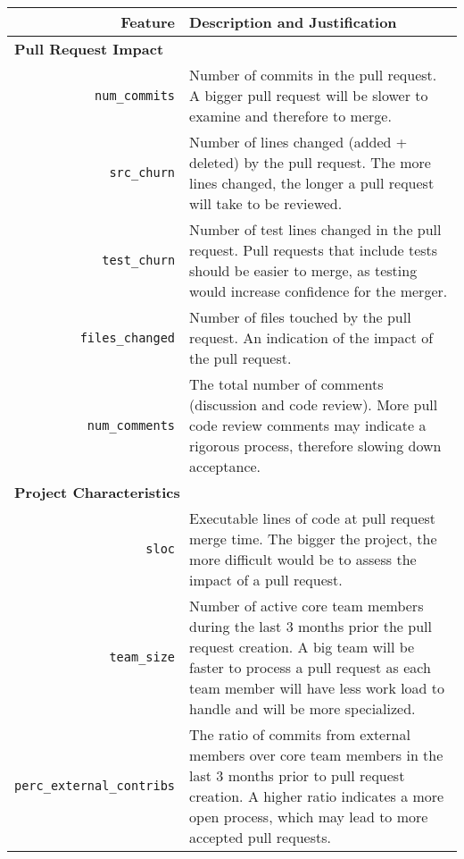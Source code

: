 \documentclass{acm_proc_article-sp}
\begin{document}
\begin{table*}
  \begin{small}
  \centering
  \begin{tabular}{rp{40em}}
    \hline
    \bf{Feature} & \bf{Description and Justification}\\
    \hline
    \multicolumn{2}{l}{\bf{Pull Request Impact}}\\
    
    \texttt{num\_commits} & Number of commits in the pull request. A bigger
    pull request will be slower to examine and therefore to merge.\\
    
    \texttt{src\_churn} & Number of lines changed (added + deleted) by the pull
    request. The more lines changed, the longer a pull request will take to be
    reviewed.\\

    \texttt{test\_churn} & Number of test lines changed in the pull request. Pull requests
    that include tests should be easier to merge, as testing would increase
    confidence for the merger.\\
    
    \texttt{files\_changed} & Number of files touched by the pull request. An
    indication of the impact of the pull request.\\
    
    \texttt{num\_comments} & The total number of comments (discussion and code
    review). More pull code review comments may indicate a rigorous process,
    therefore slowing down acceptance.\\

    \multicolumn{2}{l}{\bf{Project Characteristics}}\\
    
    \texttt{sloc} & Executable lines of code at pull request merge time. The
    bigger the project, the more difficult would be to assess the impact of
    a pull request. \\

    \texttt{team\_size} & Number of active core team members during the last
    3 months prior the pull request creation. A big team will be faster to process a
    pull request as each team member will have less work load to handle and
    will be more specialized.\\

    \texttt{perc\_external\_contribs} & The ratio of commits from external
    members over core team members in the last 3 months prior to pull request
    creation. A higher ratio indicates a more open
    process, which may lead to more accepted pull requests.\\


\end{tabular}
\end{small}
\end{table*}
\end{document}
